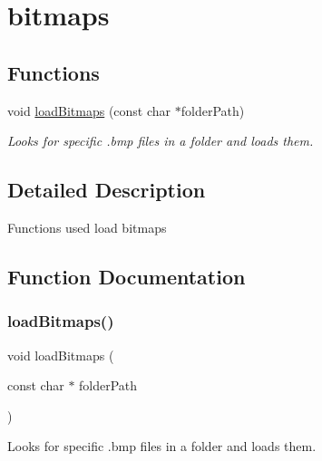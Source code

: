 \hypertarget{group__bitmaps}{}\section{bitmaps}
\label{group__bitmaps}
\subsection*{Functions}
\begin{DoxyCompactItemize}
\item 
void \mbox{\hyperlink{group__bitmaps_ga5a66eb06403c650e88bc9463e79bf9bc}{load\+Bitmaps}} (const char $\ast$folder\+Path)
\begin{DoxyCompactList}\small\item\em Looks for specific .bmp files in a folder and loads them. \end{DoxyCompactList}\end{DoxyCompactItemize}


\subsection{Detailed Description}
Functions used load bitmaps 

\subsection{Function Documentation}
\mbox{\label{group__bitmaps_ga5a66eb06403c650e88bc9463e79bf9bc}} 
\subsubsection{\texorpdfstring{load\+Bitmaps()}{loadBitmaps()}}
{\footnotesize\ttfamily void load\+Bitmaps (\begin{DoxyParamCaption}\item[{const char $\ast$}]{folder\+Path }\end{DoxyParamCaption})}



Looks for specific .bmp files in a folder and loads them. 


